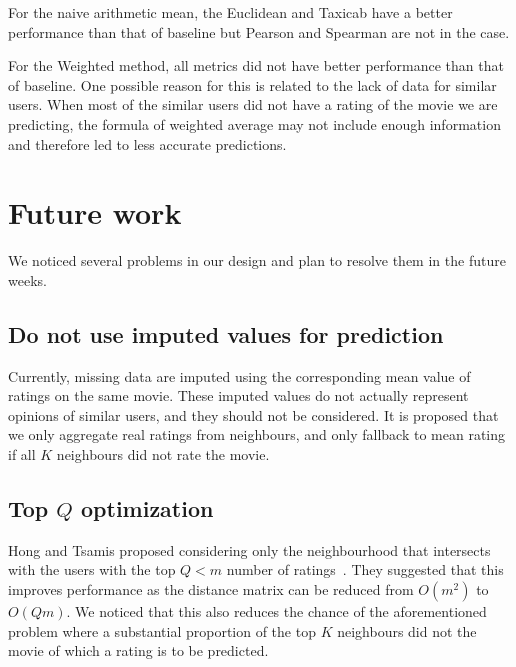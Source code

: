 \documentclass[final]{cvpr}
\begin{document}
\hspace{10em}

For the naive arithmetic mean, the Euclidean and Taxicab have a better performance than that of baseline but Pearson and Spearman are not in the case.

For the Weighted method, all metrics did not have better performance than that of baseline. One possible reason for this is related to the lack of data for similar users. When most of the similar users did not have a rating of the movie we are predicting, the formula of weighted average may not include enough information and therefore led to less accurate predictions.

\section{Future work}
We noticed several problems in our design and plan to resolve them in the future weeks.

\subsection{Do not use imputed values for prediction}
Currently, missing data are imputed using the corresponding mean value of ratings on the same movie.
These imputed values do not actually represent opinions of similar users,
and they should not be considered.
It is proposed that we only aggregate real ratings from neighbours,
and only fallback to mean rating if all $K$ neighbours did not rate the movie.

\subsection{Top $Q$ optimization}
Hong and Tsamis proposed considering only the neighbourhood that
intersects with the users with the top $Q < m$ number of ratings~\cite{Alpher01}.
They suggested that this improves performance as
the distance matrix can be reduced from $O(m^2)$ to $O(Qm)$.
We noticed that this also reduces the chance of the aforementioned problem
where a substantial proportion of the top $K$ neighbours did not the movie
of which a rating is to be predicted.

{\small
	
	
}
\end{document}
